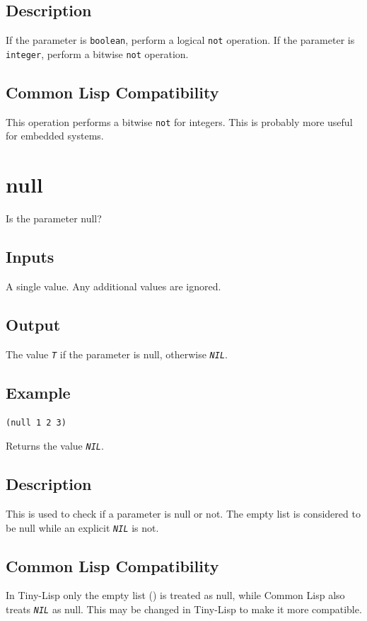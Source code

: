 \documentclass[10pt, openany]{book}
\newcommand{\constant}[1]{\emph{\texttt{#1}}}
\newcommand{\keyword}[1]{\texttt{#1}}
\newcommand{\datatype}[1]{\texttt{#1}}
\newcommand{\tl}{Tiny-Lisp}
\newcommand{\cl}{Common Lisp}
\begin{document}
\subsection{Description}
If the parameter is \datatype{boolean}, perform a logical \keyword{not} operation.  If the parameter is \datatype{integer}, perform a bitwise \keyword{not} operation.
\subsection{Common Lisp Compatibility}
This operation performs a bitwise \keyword{not} for integers.  This is probably more useful for embedded systems.

\section{null}
Is the parameter null?
\subsection{Inputs}
A single value.  Any additional values are ignored.
\subsection{Output}
The value \constant{T} if the parameter is null, otherwise \constant{NIL}.
\subsection{Example}
\begin{lstlisting}
(null 1 2 3)
\end{lstlisting}
Returns the value \constant{NIL}.
\subsection{Description}
This is used to check if a parameter is null or not.  The empty list is considered to be null while an explicit \constant{NIL} is not.
\subsection{Common Lisp Compatibility}
In \tl{} only the empty list () is treated as null, while \cl{} also treats \constant{NIL} as null.  This may be changed in \tl{} to make it more compatible.

\end{document}
